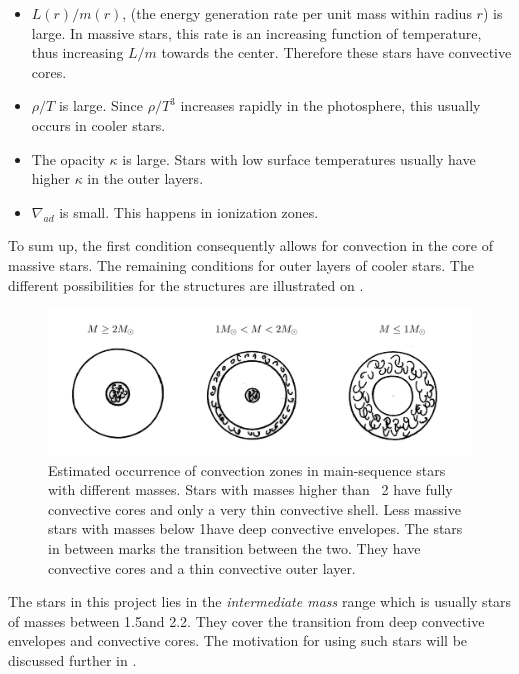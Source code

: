 \begin{itemize}
    \item $L(r)/m(r)$, (the energy generation rate per unit mass within radius $r$) is large. In massive stars, this rate is an increasing function of temperature, thus increasing $L/m$ towards the center. Therefore these stars have convective cores.
    \item $\rho/T$ is large. Since $\rho/T^3$ increases rapidly in the photosphere, this usually occurs in cooler stars. 
    \item The opacity $\kappa$ is large. Stars with low surface temperatures usually have higher $\kappa$ in the outer layers. 
    \item $\nabla_{ad}$ is small. This happens in ionization zones.
\end{itemize}

To sum up, the first condition consequently allows for convection in the core of massive stars. The remaining conditions for outer layers of cooler stars. The different possibilities for the structures are illustrated on . 

\begin{figure}[htbp]
    \centering
    \includegraphics[width=1\textwidth]{convection_zones.png}
    \caption{Estimated occurrence of convection zones in main-sequence stars with different masses. Stars with masses higher than ~2 \msun have fully convective cores and only a very thin convective shell. Less massive stars with masses below 1\msun have deep convective envelopes. The stars in between marks the transition between the two. They have convective cores and a thin convective outer layer.}
    \label{convectionzones}
\end{figure}

The stars in this project lies in the \textit{intermediate mass} range which is usually stars of masses between 1.5\msun and 2.2\msun. They cover the transition from deep convective envelopes and convective cores. The motivation for using such stars will be discussed further in .

